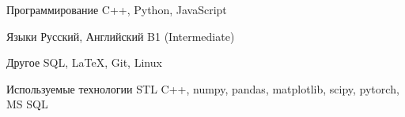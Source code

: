 

\begin{cvskills}

%


  \cvskill
    {Программирование} %
    {C++, Python, JavaScript} %

  \cvskill
    {Языки} %
    {Русский, Английский B1 (Intermediate)} %

  \cvskill
    {Другое} %
    {SQL, LaTeX, Git, Linux} %

    \cvskill
    {Используемые технологии}
    {STL C++, numpy, pandas,
    matplotlib, scipy, pytorch, MS SQL}
\end{cvskills}
